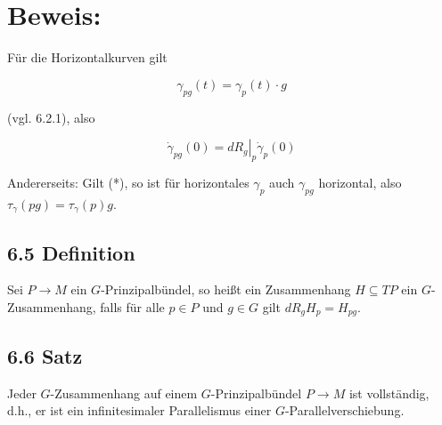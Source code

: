 \documentclass[10pt, letterpaper]{article}
\begin{document}
\section*{Beweis:}
Für die Horizontalkurven gilt

$$
\gamma_{p g}(t)=\gamma_{p}(t) \cdot g
$$

(vgl. 6.2.1), also

$$
\dot{\gamma}_{p g}(0)=\left.d R_{g}\right|_{p} \dot{\gamma}_{p}(0)
$$

Andererseits: Gilt (*), so ist für horizontales $\gamma_{p}$ auch $\gamma_{p g}$ horizontal, also $\tau_{\gamma}(p g)=\tau_{\gamma}(p) g$.

\subsection*{6.5 Definition}
Sei $P \rightarrow M$ ein $G$-Prinzipalbündel, so heißt ein Zusammenhang $H \subseteq T P$ ein $G$-Zusammenhang, falls für alle $p \in P$ und $g \in G$ gilt $d R_{g} H_{p}=H_{p g}$.

\subsection*{6.6 Satz}
Jeder $G$-Zusammenhang auf einem $G$-Prinzipalbündel $P \rightarrow M$ ist vollständig, d.h., er ist ein infinitesimaler Parallelismus einer $G$-Parallelverschiebung.
\end{document}
